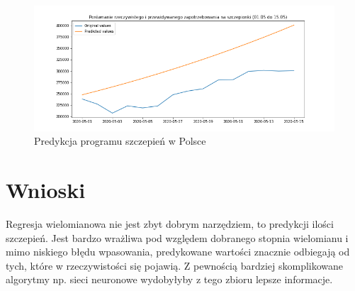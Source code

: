 \documentclass[12pt, oneside]{article}
\begin{document}
\begin{figure}[h!]
\centering
\includegraphics[height=0.25\textheight]{../img/demand2.png} 
\caption{Predykcja programu szczepień w Polsce}
\label{Rys:boxplotSamples}
\end{figure}


\section{Wnioski}

Regresja wielomianowa nie jest zbyt dobrym narzędziem, to predykcji ilości szczepień. Jest bardzo wrażliwa pod względem dobranego stopnia wielomianu i mimo niskiego błędu wpasowania, predykowane wartości znacznie odbiegają od tych, które w rzeczywistości się pojawią. Z pewnością bardziej skomplikowane algorytmy np. sieci neuronowe wydobyłyby z tego zbioru lepsze informacje. 
\end{document}
